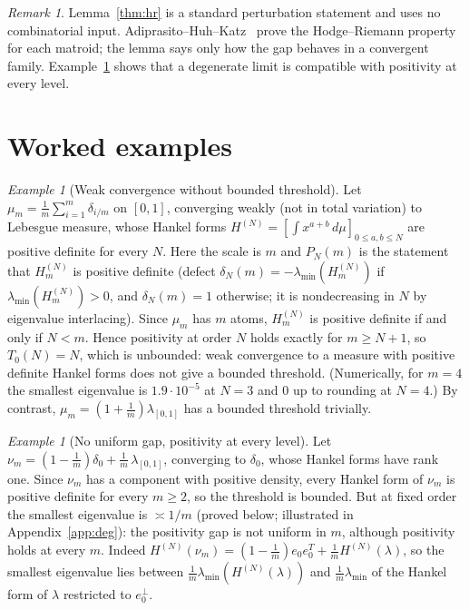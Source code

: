 \documentclass[11pt]{amsart}
\theoremstyle{definition}
\theoremstyle{remark}
\newtheorem{remark}[theorem]{Remark}
\newtheorem{example}[theorem]{Example}
\begin{document}
\begin{remark}
Lemma~\ref{thm:hr} is a standard perturbation statement and uses no
combinatorial input. Adiprasito--Huh--Katz~\cite{AHK} prove the Hodge--Riemann
property for each matroid; the lemma says only how the gap behaves in a convergent
family. Example~\ref{ex:deg} shows that a degenerate limit is compatible with
positivity at every level.
\end{remark}

\section{Worked examples}
\begin{example}[Weak convergence without bounded threshold]\label{ex:def}
Let $\mu_m=\tfrac1m\sum_{i=1}^m\delta_{i/m}$ on $[0,1]$, converging weakly (not
in total variation) to Lebesgue measure, whose Hankel forms
$H^{(N)}=[\int x^{a+b}\,d\mu]_{0\le a,b\le N}$ are positive definite for every $N$.
Here the scale is $m$ and $P_N(m)$ is the statement that $H_m^{(N)}$ is
positive definite (defect $\delta_N(m)=-\lambda_{\min}(H_m^{(N)})$ if
$\lambda_{\min}(H_m^{(N)})>0$, and $\delta_N(m)=1$ otherwise; it is
nondecreasing in $N$ by eigenvalue interlacing). Since $\mu_m$ has $m$ atoms,
$H_m^{(N)}$ is positive definite if and only if $N<m$. Hence positivity at
order $N$ holds exactly for $m\ge N+1$, so $T_0(N)=N$, which is unbounded: weak
convergence to a measure with positive definite Hankel forms does not give a
bounded threshold. (Numerically, for $m=4$ the smallest eigenvalue is
$1.9\cdot10^{-5}$ at $N=3$ and $0$ up to rounding at $N=4$.) By contrast,
$\mu_m=(1+\tfrac1m)\lambda_{[0,1]}$ has a bounded threshold trivially.
\end{example}

\begin{example}[No uniform gap, positivity at every level]\label{ex:deg}
Let $\nu_m=(1-\tfrac1m)\delta_0+\tfrac1m\,\lambda_{[0,1]}$, converging to
$\delta_0$, whose Hankel forms have rank one. Since $\nu_m$ has a component with
positive density, every Hankel form of $\nu_m$ is positive definite for every
$m\ge2$, so the threshold is bounded. But at fixed order the smallest eigenvalue
is $\asymp1/m$ (proved below; illustrated in Appendix~\ref{app:deg}): the positivity gap is not
uniform in $m$, although positivity holds at every $m$. Indeed
$H^{(N)}(\nu_m)=(1-\tfrac1m)e_0e_0^{T}+\tfrac1mH^{(N)}(\lambda)$, so the smallest
eigenvalue lies between $\tfrac1m\lambda_{\min}(H^{(N)}(\lambda))$ and
$\tfrac1m\lambda_{\min}$ of the Hankel form of $\lambda$ restricted to $e_0^\perp$.
\end{example}
\end{document}
